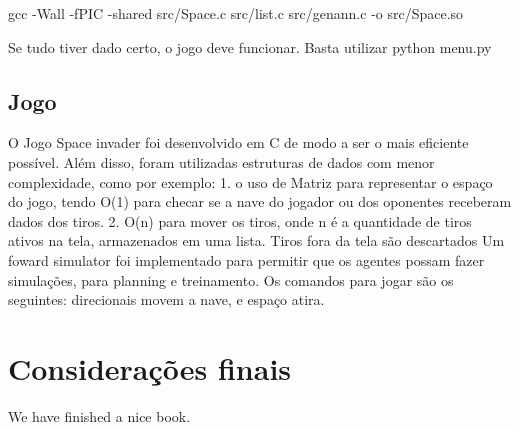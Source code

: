 \documentclass[]{book}
\begin{document}
gcc -Wall -fPIC -shared src/Space.c src/list.c src/genann.c -o
src/Space.so

Se tudo tiver dado certo, o jogo deve funcionar. Basta utilizar python
menu.py

\section{Jogo}\label{jogo}

O Jogo Space invader foi desenvolvido em C de modo a ser o mais
eficiente possível. Além disso, foram utilizadas estruturas de dados com
menor complexidade, como por exemplo: 1. o uso de Matriz para
representar o espaço do jogo, tendo O(1) para checar se a nave do
jogador ou dos oponentes receberam dados dos tiros. 2. O(n) para mover
os tiros, onde n é a quantidade de tiros ativos na tela, armazenados em
uma lista. Tiros fora da tela são descartados Um foward simulator foi
implementado para permitir que os agentes possam fazer simulações, para
planning e treinamento. Os comandos para jogar são os seguintes:
direcionais movem a nave, e espaço atira.

\chapter{Considerações finais}\label{considerauxe7uxf5es-finais}

We have finished a nice book.


\end{document}
